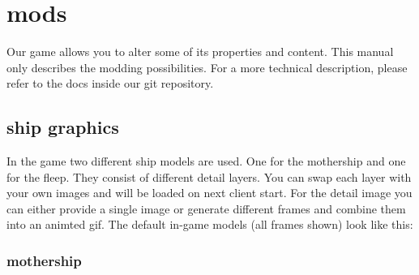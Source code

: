 \chapter*{mods}
Our game allows you to alter some of its properties and content. This manual only describes the modding possibilities. For a more technical description, please refer to the docs inside our git repository. 

\section*{ship graphics}
In the game two different ship models are used. One for the mothership and one for the fleep. They consist of different detail layers. You can swap each layer with your own images and will be loaded on next client start. For the detail image you can either provide a single image or generate different frames and combine them into an animted gif. The default in-game models (all frames shown) look like this:

\subsection*{mothership}

